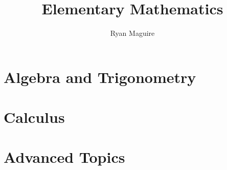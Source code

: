 \documentclass[oneside]{book}                                                  %
\title{Elementary Mathematics}                                                 %
\author{Ryan Maguire}                                                          %
\date{\vspace{-5ex}}                                                           %
\begin{document}
    \maketitle
    \tableofcontents
    \listoffigures
    \listoftables
    \clearpage
    \part{Algebra and Trigonometry}
        
        
        
    \part{Calculus}
        
        
        
        
    \part{Advanced Topics}
        
        
        
        

    \printglossary[type=\acronymtype]
    \clearpage
    \printglossary[style=long]
\end{document}
